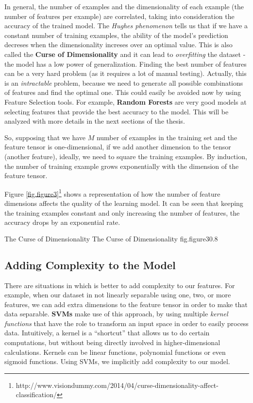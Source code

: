 In general, the number of examples and the dimensionality of each example 
(the number of features per example) are correlated, taking into consideration 
the accuracy of the trained model. The {\it Hughes phenomenon}\cite{hughes} 
tells us that if we have a constant number of training examples, the ability 
of the model's prediction decreses when the dimensionality increses over an 
optimal value. This is also called the {\bf Curse of Dimensionality} and it 
can lead to {\it overfitting} the dataset - the model has a low power of 
generalization. Finding the best number of features can be a very hard problem 
(as it requires a lot of manual testing). Actually, this is an {\it intractable} 
problem, because we need to generate all possible combinations of features and 
find the optimal one. This could easily be avoided now by using Feature Selection 
tools. For example, {\bf Random Forests} are very good models at selecting 
features that provide the best accuracy to the model. This will be analyzed 
with more details in the next sections of the thesis. 

So, supposing that we have $M$ number of examples in the training set and 
the feature tensor is one-dimensional, if we add another dimension to the 
tensor (another feature), ideally, we need to square the training examples. 
By induction, the number of training example grows exponentially with the 
dimension of the feature tensor.

Figure \ref{fig.figure3}\footnote{http://www.visiondummy.com/2014/04/curse-dimensionality-affect-classification/} shows a representation of how the number of feature dimensions 
affects the quality of the learning model. It can be seen that keeping the 
training examples constant and only increasing the number of features, the 
accuracy drops by an exponential rate. 

%
    {The Curse of Dimensionality}%
    {The Curse of Dimensionality}%
    {fig.figure3}{0.8}

\subsection{Adding Complexity to the Model}

There are situations in which is better to add complexity to our features. 
For example, when our dataset in not linearly separable using one, two, or more 
features, we can add extra dimensions to the feature tensor in order to make 
that data separable. {\bf SVMs} make use of this approach, by using multiple 
{\it kernel functions} that have the role to transform an input space in order 
to easily process data. Intuitively, a kernel is a ``shortcut'' that allows us 
to do certain computations, but without being directly involved in higher-dimensional 
calculations. Kernels can be linear functions, polynomial functions or even sigmoid 
functions. Using SVMs, we implicitly add complexity to our model.

